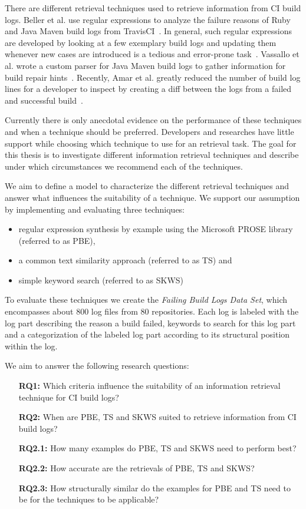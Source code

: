 \documentclass[\myrootdir/main.tex]{subfiles}
\begin{document}
There are different retrieval techniques used to retrieve information from CI build logs. Beller et al. use regular expressions to analyze the failure reasons of Ruby and Java Maven build logs from TravisCI~\cite{beller2017oops}.
In general, such regular expressions are developed by looking at a few exemplary build logs and updating them whenever new cases are introduced is a tedious and error-prone task~\cite{michael2019regexes}.
Vassallo et al. wrote a custom parser for Java Maven build logs to gather information for build repair hints~\cite{vassallo2018un-break}.
Recently, Amar et al. greatly reduced the number of build log lines for a developer to inspect by creating a diff between the logs from a failed and successful build~\cite{amar2019mining}.

Currently there is only anecdotal evidence on the performance of these techniques and when a technique should be preferred. Developers and researches have little support while choosing which technique to use for an retrieval task. The goal for this thesis is to investigate different information retrieval techniques and describe under which circumstances we recommend each of the techniques.

We aim to define a model to characterize the different retrieval techniques and answer what influences the suitability of a technique.
We support our assumption by implementing and evaluating three techniques:
\begin{itemize}
  \item regular expression synthesis by example using the Microsoft PROSE library (referred to as PBE),
  \item a common text similarity approach (referred to as TS) and
  \item simple keyword search (referred to as SKWS)
\end{itemize}
To evaluate these techniques we create the \emph{Failing Build Logs Data Set}, which encompasses about 800 log files from 80 repositories. Each log is labeled with the log part describing the reason a build failed, keywords to search for this log part and a categorization of the labeled log part according to its structural position within the log. 


We aim to answer the following research questions:
\begin{itemize}
  \item[\textbf{RQ1:}] Which criteria influence the suitability of an information retrieval technique for CI build logs?
  \item[\textbf{RQ2:}] When are PBE, TS and SKWS suited to retrieve information from CI build logs?
  \item[\textbf{RQ2.1:}] How many examples do PBE, TS and SKWS need to perform best?
  \item[\textbf{RQ2.2:}] How accurate are the retrievals of PBE, TS and SKWS?
  \item[\textbf{RQ2.3:}] How structurally similar do the examples for PBE and TS need to be for the techniques to be applicable?
\end{itemize}
\end{document}
